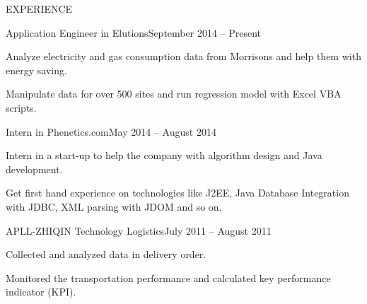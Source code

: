 \documentclass{resume} %
\begin{document}
\begin{rSection}{EXPERIENCE}
\begin{rSubsection}{Application Engineer in Elutions}{September 2014 -- Present}{}{}
\item Analyze electricity and gas consumption data from Morrisons and help them with energy saving.
\item Manipulate data for over 500 sites and run regression model with Excel VBA scripts.
\end{rSubsection}
\begin{rSubsection}{Intern in Phenetics.com}{May 2014 -- August 2014}{}{}
\item Intern in a start-up to help the company with algorithm design and Java development.
\item Get first hand experience on technologies like J2EE, Java Database Integration with JDBC,
XML parsing with JDOM and so on.
\end{rSubsection}
\begin{rSubsection}{APLL-ZHIQIN Technology Logistics}{July 2011 -- August 2011}{}{}
\item Collected and analyzed data in delivery order.
\item Monitored the transportation performance and calculated key performance indicator (KPI).
\end{rSubsection}
\end{rSection}
\end{document}
